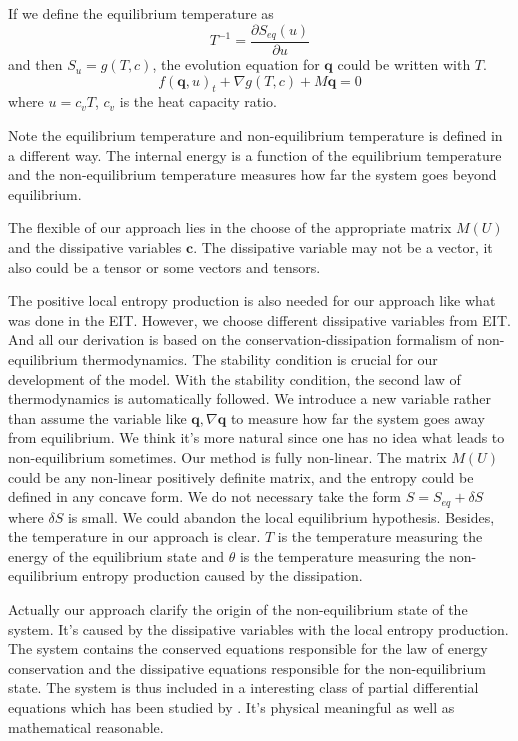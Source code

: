 \documentclass[a4paper]{article}
\begin{document}
If we define the equilibrium temperature as
\begin{equation}
T^{-1} = \frac{\partial S_{eq}(u)}{\partial u}
\end{equation}
and then $S_u = g(T,c)$, the evolution equation for $\mathbf{q}$ could be written with $T$.
\begin{equation}
f(\mathbf{q},u)_t + \nabla g(T,c) + M \mathbf{q} = 0
\end{equation}
where $u=c_v T$, $c_v$ is the heat capacity ratio.

Note the equilibrium temperature and non-equilibrium temperature is defined in a different way. The internal energy is a function of the equilibrium temperature and the non-equilibrium temperature measures how far the system goes beyond equilibrium.

The flexible of our approach lies in the choose of the appropriate matrix $M(U)$ and the dissipative variables $\mathbf{c}$. The dissipative variable may not be a vector, it also could be a tensor or some vectors and tensors. 

The positive local entropy production is also needed for our approach like what was done in the EIT. However, we choose different dissipative variables from EIT. And all our derivation is based on the conservation-dissipation formalism of non-equilibrium thermodynamics. The stability condition is crucial for our development of the model. With the stability condition, the second law of thermodynamics is automatically followed. We introduce a new variable rather than assume the variable like $\mathbf{q},\nabla \mathbf{q}$ to measure how far the system goes away from equilibrium. We think it's more natural  since one has no idea what leads to non-equilibrium sometimes. Our method is fully non-linear. The matrix $M(U)$ could be any non-linear positively definite matrix, and the entropy could be defined in any concave form. We do not necessary take the form $S=S_{eq}+\delta S$ where $\delta S$ is small. We could abandon the local equilibrium hypothesis. Besides, the temperature in our approach is clear. $T$ is the temperature measuring the energy of the equilibrium state and $\theta$ is the temperature measuring the non-equilibrium entropy production caused by the dissipation.  

Actually our approach clarify the origin of the non-equilibrium state of the system. It's caused by the dissipative variables with the local entropy production. The system contains the conserved equations responsible for the law of energy conservation and the dissipative equations responsible for the non-equilibrium state. The system is thus included in a interesting class of partial differential equations which has been studied by \cite{yong2008interesting}. It's physical meaningful as well as mathematical reasonable.
\end{document}
